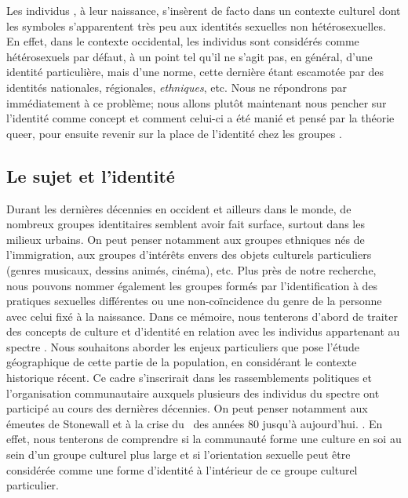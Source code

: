 Les individus \lgbt{}, à leur naissance, s'insèrent de facto dans un contexte culturel dont les symboles s'apparentent très peu aux identités sexuelles non hétérosexuelles.
En effet, dans le contexte occidental, les individus sont considérés comme hétérosexuels par défaut, à un point tel qu'il ne s'agit pas, en général, d'une identité particulière, mais d'une norme, cette dernière étant escamotée par des identités nationales, régionales, \emph{ethniques}, etc.
Nous ne répondrons par immédiatement à ce problème; nous allons plutôt maintenant nous pencher sur l'identité comme concept et comment celui-ci a été manié et pensé par la théorie queer, pour ensuite revenir sur la place de l'identité chez les groupes \lgbt{}.

\subsection{Le sujet et l'identité}
\label{subsec:sujet_et_identité} Durant les dernières décennies en occident et ailleurs dans le monde, de nombreux groupes identitaires semblent avoir fait surface, surtout dans les milieux urbains.
On peut penser notamment aux groupes ethniques nés de l'immigration, aux groupes d'intérêts envers des objets culturels particuliers (genres musicaux, dessins animés, cinéma), etc.
Plus près de notre recherche, nous pouvons nommer également les groupes formés par l'identification à des pratiques sexuelles différentes ou une non-coïncidence du genre de la personne avec celui fixé à la naissance.
Dans ce mémoire, nous tenterons d'abord de traiter des concepts de culture et d'identité en relation avec les individus appartenant au spectre \lgbt{} .
Nous souhaitons aborder les enjeux particuliers que pose l'étude géographique de cette partie de la population, en considérant le contexte historique récent.
Ce cadre s'inscrirait dans les rassemblements politiques et l'organisation communautaire auxquels plusieurs des individus du spectre \lgbt{} ont participé au cours des dernières décennies.
On peut penser notamment aux émeutes de Stonewall et à la crise du \sida\ des années 80 jusqu'à aujourd'hui.
.
En effet, nous tenterons de comprendre si la communauté \lgbt{} forme une culture en soi au sein d'un groupe culturel plus large et si l'orientation sexuelle peut être considérée comme une forme d'identité à l'intérieur de ce groupe culturel particulier.

